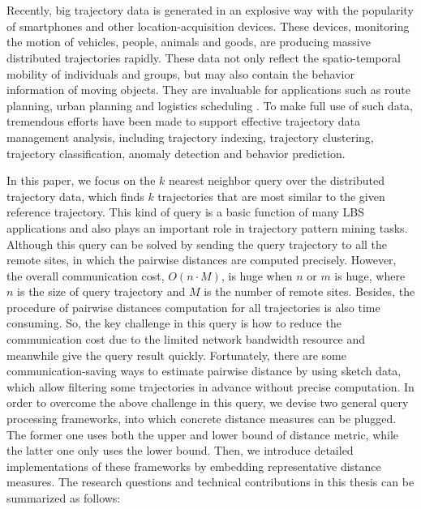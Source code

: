\newpage
\vspace{-1cm}
\chapter*{}
\vspace{-0.5cm}

Recently, big trajectory data  is generated in an explosive way with the popularity of smartphones and other location-acquisition devices.
 These devices, monitoring the motion of vehicles, people, animals and goods, are producing massive distributed trajectories rapidly. 
 These data not only reflect the spatio-temporal mobility of individuals and groups, but may also contain the behavior information of moving objects. They are invaluable for applications such as  route planning, urban planning and logistics scheduling .
 To make full use of such data, tremendous efforts have been made to support effective trajectory data management analysis, including trajectory indexing, trajectory clustering, trajectory classification,  anomaly detection and  behavior prediction.
 
 In this paper, we focus on the $k$ nearest neighbor query over the distributed trajectory data, which finds $k$ trajectories that are most similar to the given reference trajectory. This kind of query is a basic function of many  LBS applications and  also plays an important role in  trajectory pattern mining tasks.
Although this query can be solved by sending the query trajectory to all the remote sites, in which the pairwise distances are computed precisely.
However, the overall communication cost, $O(n\cdot M)$, is huge when $n$ or $m$ is huge, where $n$ is the size of  query trajectory and $M$ is the number of remote sites. Besides, the procedure of pairwise distances computation for all trajectories is also time consuming.
So, the key challenge in this query is  how to reduce the communication cost due to the limited network bandwidth resource and meanwhile  give the query result quickly.
Fortunately, there are some communication-saving ways to estimate pairwise distance by using sketch data,
 which allow filtering some trajectories in advance without precise computation.
In order to overcome the above challenge in this query, we devise two general query processing frameworks, into which concrete distance measures can be plugged. 
The former one uses both the upper and lower bound of distance metric, while the latter one only uses the lower bound. Then, we introduce detailed implementations of  these frameworks by embedding  representative distance measures. The research questions and technical contributions in this thesis can be summarized as follows:


